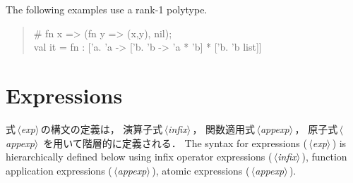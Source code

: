 \documentclass{jbook}
\newcommand{\txt}[2]{#2}
\newcommand{\nonterm}[1]{\mbox{$\,\langle$}{\it #1}\mbox{$\rangle\,$}}
\newenvironment{program}{\begin{quote}\begin{tt}}%
                        {\end{tt}\end{quote}}
\begin{document}
	The following examples use a rank-1 polytype.
\fi%
\begin{program}
\# fn x => (fn y => (x,y), nil);\\
val it = fn : ['a. 'a -> ['b. 'b -> 'a * 'b] * ['b. 'b list]]
\end{program}

\chapter{\txt{式}{Expressions}}
\label{chap:reference:expressions}
\ifjp%
	式\nonterm{exp}の構文の定義は，
演算子式\nonterm{infix}，
関数適用式\nonterm{appexp}，
原子式\nonterm{appexp}
を用いて階層的に定義される．
\else%
	The syntax for expressions (\nonterm{exp}) is hierarchically
defined below using infix operator expressions (\nonterm{infix}), 
function application expressions (\nonterm{appexp}), 
atomic expressions (\nonterm{appexp}).
\fi%
\end{document}

